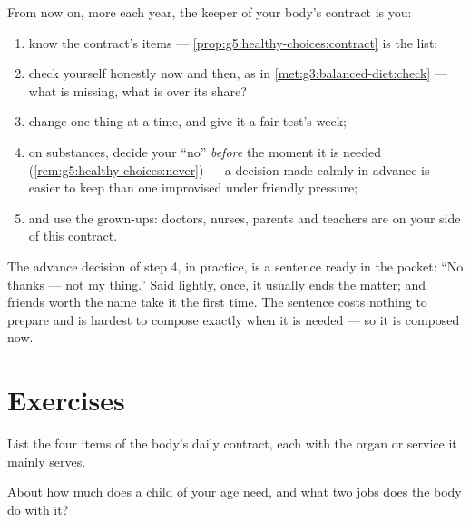 \begin{method}\label{met:g5:healthy-choices:run}
From now on, more each year, the keeper of your body's
contract is you:
\begin{enumerate}
  \item know the contract's items ---
        \cref{prop:g5:healthy-choices:contract} is the list;
  \item check yourself honestly now and then, as in
        \cref{met:g3:balanced-diet:check} --- what is
        missing, what is over its share?
  \item change one thing at a time, and give it a fair
        test's week;
  \item on substances, decide your ``no'' \emph{before} the
        moment it is needed
        (\cref{rem:g5:healthy-choices:never}) --- a decision
        made calmly in advance is easier to keep than one
        improvised under friendly pressure;
  \item and use the grown-ups: doctors, nurses, parents and
        teachers are on your side of this contract.
\end{enumerate}
\end{method}

\begin{example}\label{ex:g5:healthy-choices:answers}
The advance decision of step 4, in practice, is a sentence
ready in the pocket: ``No thanks --- not my thing.'' Said
lightly, once, it usually ends the matter; and friends worth
the name take it the first time. The sentence costs nothing
to prepare and is hardest to compose exactly when it is
needed --- so it is composed now.
\end{example}

\section{Exercises}

\begin{exercise}[$\star$]\label{exo:g5:healthy-choices:1}
List the four items of the body's daily contract, each with
the organ or service it mainly serves.
\end{exercise}

\begin{exercise}[$\star$]\label{exo:g5:healthy-choices:2}
About how much  does a child of your age need, and
what two jobs does the body do with it?
\end{exercise}


